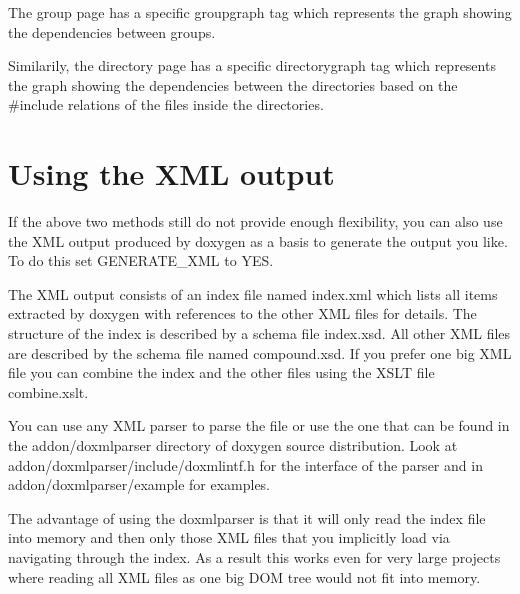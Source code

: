 The group page has a specific {\ttfamily groupgraph} tag which represents the graph showing the dependencies between groups.

Similarily, the directory page has a specific {\ttfamily directorygraph} tag which represents the graph showing the dependencies between the directories based on the \#include relations of the files inside the directories.\hypertarget{customize_xmlgenerator}{}\section{Using the XML output}\label{customize_xmlgenerator}
If the above two methods still do not provide enough flexibility, you can also use the XML output produced by doxygen as a basis to generate the output you like. To do this set GENERATE\_\-XML to YES.

The XML output consists of an index file named {\ttfamily index.xml} which lists all items extracted by doxygen with references to the other XML files for details. The structure of the index is described by a schema file {\ttfamily index.xsd}. All other XML files are described by the schema file named {\ttfamily compound.xsd}. If you prefer one big XML file you can combine the index and the other files using the XSLT file {\ttfamily combine.xslt}.

You can use any XML parser to parse the file or use the one that can be found in the {\ttfamily addon/doxmlparser} directory of doxygen source distribution. Look at {\ttfamily addon/doxmlparser/include/doxmlintf.h} for the interface of the parser and in {\ttfamily addon/doxmlparser/example} for examples.

The advantage of using the doxmlparser is that it will only read the index file into memory and then only those XML files that you implicitly load via navigating through the index. As a result this works even for very large projects where reading all XML files as one big DOM tree would not fit into memory. 